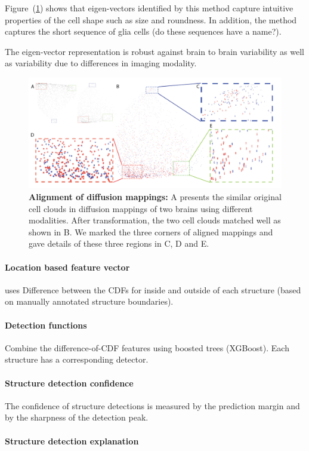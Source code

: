 \documentclass[11pt]{article}
\begin{document}
Figure~(\ref{fig:eigenmap}) shows that eigen-vectors identified by this method capture intuitive
properties of the cell shape such as size and roundness. In addition,
the method captures the short sequence  of glia cells (do these sequences
have a name?).

The eigen-vector representation is robust against brain to brain
variability as well as variability due to differences in imaging
modality.

\begin{figure}[t]
  \includegraphics[width=\textwidth]{figures/Diffusionmap.png}
  \caption{\label{fig:eigenmap}{\bf Alignment of diffusion mappings:} A presents the
    similar original cell clouds in diffusion mappings of two brains
    using different modalities. After transformation, the two cell
    clouds matched well as shown in B. We marked the three corners of
    aligned mappings and gave details of these three regions in C, D
    and E.  }
\end{figure}

\paragraph{Location based feature vector} uses Difference between the CDFs for inside and outside of each structure (based on manually annotated structure boundaries). 
\paragraph{Detection functions} Combine the difference-of-CDF
features using boosted trees (XGBoost). Each structure has a
corresponding detector.

\paragraph{Structure detection confidence} The confidence of structure
  detections is measured by the prediction margin and by the sharpness
  of the detection peak.

\paragraph{ Structure detection explanation}


 
 
\end{document}
